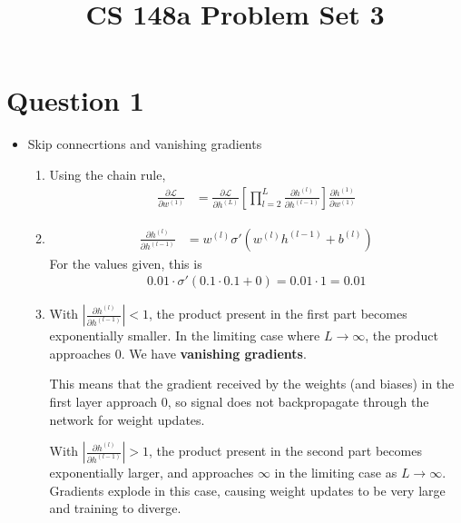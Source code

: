 \documentclass{article}
\title{CS 148a Problem Set 3}
\date{}
\newcommand{\loss}{\mathcal{L}}
\newcommand{\pd}[2]{\frac{\partial #1}{\partial #2}}
\begin{document}
\maketitle

\newpage

\section*{Question 1}
\begin{itemize}
    \item[(e)] Skip connecrtions and vanishing gradients \begin{enumerate}
        \item Using the chain rule, \begin{align*}
            \pd{\loss}{w^{(1)}} &= \pd{\loss}{h^{(L)}} \left[\prod_{l=2}^{L} \pd{h^{(l)}}{h^{(l-1)}} \right] \pd{h^{(1)}}{w^{(1)}}
        \end{align*}
        \item \begin{align*}
            \pd{h^{(l)}}{h^{(l-1)}} &= w^{(l)}  \sigma'(w^{(l)}h^{(l-1)} + b^{(l)})
        \end{align*}
        For the values given, this is \begin{align*}
            0.01 \cdot \sigma'(0.1\cdot 0.1 + 0) = 0.01 \cdot 1 = 0.01
        \end{align*}
        \item With $\left| \pd{h^{(l)}}{h^{(l-1)}}  \right| < 1 $, the product present in the first part becomes exponentially smaller. In the limiting case where $L \to \infty$, the product approaches 0. We have \textbf{vanishing gradients}.
        
        This means that the gradient received by the weights (and biases) in the first layer approach 0, so signal does not backpropagate through the network for weight updates. 

        With $\left| \pd{h^{(l)}}{h^{(l-1)}}  \right| > 1$, the product present in the second part becomes exponentially larger, and approaches $\infty$ in the limiting case as $L \to \infty$. Gradients explode in this case, causing weight updates to be very large and training to diverge. 


\end{enumerate}
\end{itemize}
\end{document}
